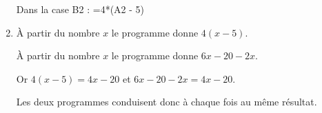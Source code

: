 \begin{enumerate}
Dans la case B2 : =4*(A2 - 5)
\item %

À partir du nombre $x$ le programme  donne $4(x - 5)$.

À partir du nombre $x$ le programme  donne $6x - 20 - 2x$.

Or $4(x - 5) = 4x - 20$ et $6x - 20 - 2x = 4x - 20$.

Les deux programmes conduisent donc à chaque fois au même résultat.
\end{enumerate}

\medskip

